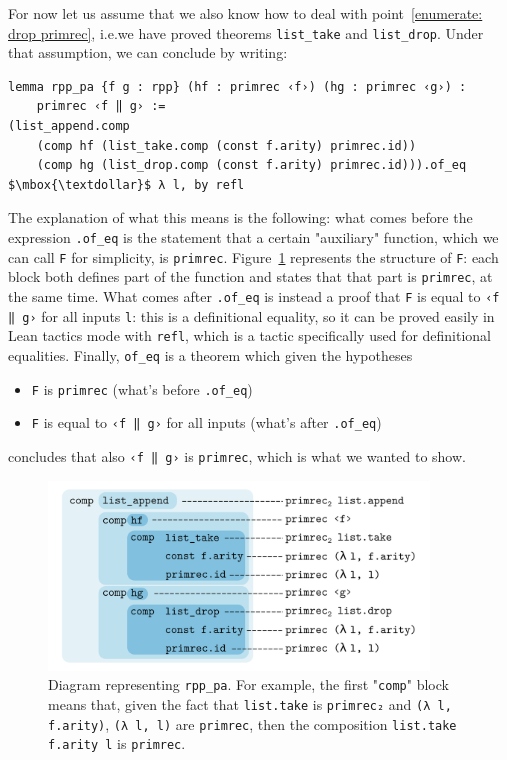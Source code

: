 \documentclass[preprint]{elsarticle}
\theoremstyle{remark}
\newcommand{\LEAN}{\textsf{Lean}\xspace}
\begin{document}
\vspace{\baselineskip}
For now let us assume that we also know how to deal with point~\ref{enumerate: drop primrec}, i.e.\@ we have proved theorems \lstinline|list_take| and \lstinline|list_drop|. Under that assumption, we can conclude by writing:
\begin{lstlisting}
lemma rpp_pa {f g : rpp} (hf : primrec ‹f›) (hg : primrec ‹g›) :
    primrec ‹f ‖ g› :=
(list_append.comp
    (comp hf (list_take.comp (const f.arity) primrec.id))
    (comp hg (list_drop.comp (const f.arity) primrec.id))).of_eq
$\mbox{\textdollar}$ λ l, by refl
\end{lstlisting}
\noindent
The explanation of what this means is the following: what comes before the expression \lstinline|.of_eq| is the statement that a certain "auxiliary" function, which we can call \lstinline|F| for simplicity, is \lstinline|primrec|. Figure~\ref{fig:rpp_pa} represents the structure of \lstinline|F|: each block both defines part of the function and states that that part is \lstinline|primrec|, at the same time. What comes after \lstinline|.of_eq| is instead a proof that \lstinline|F| is equal to \lstinline|‹f ‖ g›| for all inputs \lstinline|l|: this is a definitional equality, so it can be proved easily in \LEAN tactics mode with \lstinline|refl|, which is a tactic specifically used for definitional equalities. Finally, \lstinline|of_eq| is a theorem which given the hypotheses
\begin{itemize}
\item \lstinline|F| is \lstinline|primrec| (what's before \lstinline|.of_eq|)
\item \lstinline|F| is equal to \lstinline|‹f ‖ g›| for all inputs (what's after \lstinline|.of_eq|)
\end{itemize}
concludes that also \lstinline|‹f ‖ g›| is \lstinline|primrec|, which is what we wanted to show.
\begin{figure}[H]
    \centering
    \includegraphics[width=0.9\textwidth]{drawing.png}
    \caption{Diagram representing \lstinline|rpp_pa|. For example, the first "\lstinline|comp|" block means that, given the fact that \lstinline|list.take| is \lstinline|primrec₂| and \lstinline|(λ l, f.arity)|, \lstinline|(λ l, l)| are \lstinline|primrec|, then the composition \lstinline|list.take f.arity l| is \lstinline|primrec|.}
    \label{fig:rpp_pa}
\end{figure}
\end{document}
